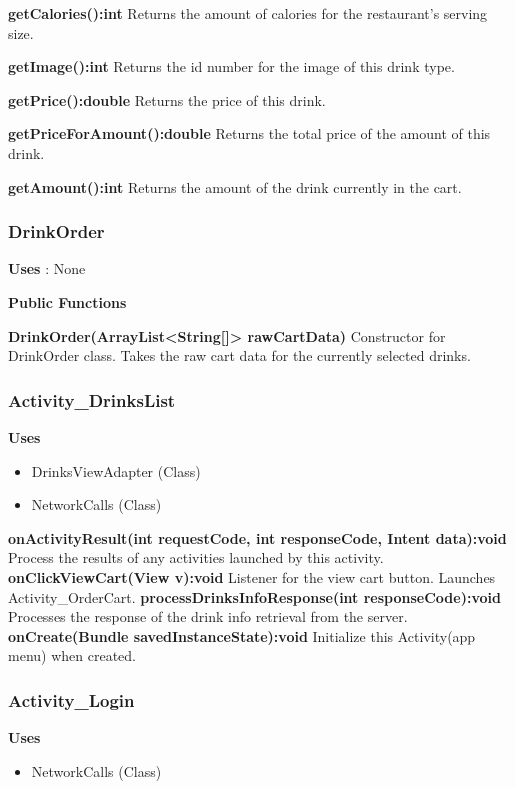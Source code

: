 \documentclass [10pt]{article}
\begin{document}
\textbf{getCalories():int}
Returns the amount of calories for the restaurant’s serving size.

\textbf{getImage():int}
Returns the id number for the image of this drink type.

\textbf{getPrice():double}
Returns the price of this drink.

\textbf{getPriceForAmount():double}
Returns the total price of the amount of this drink.

\textbf{getAmount():int}
Returns the amount of the drink currently in the cart.

\subsubsection{DrinkOrder}

\textbf{Uses} : None

\textbf{Public Functions}

\textbf{DrinkOrder(ArrayList<String[]> rawCartData)}
Constructor for DrinkOrder class. Takes the raw cart data for the currently selected drinks.

\subsubsection{Activity\_DrinksList}

\textbf{Uses}

\begin{itemize}
	\item DrinksViewAdapter (Class)
	\item NetworkCalls (Class)
\end{itemize}

\textbf{onActivityResult(int requestCode, int responseCode, Intent data):void}
Process the results of any activities launched by this activity.
\textbf{onClickViewCart(View v):void}
Listener for the view cart button. Launches Activity\_OrderCart.
\textbf{processDrinksInfoResponse(int responseCode):void}
Processes the response of the drink info retrieval from the server.
\textbf{onCreate(Bundle savedInstanceState):void}
Initialize this Activity(app menu) when created.

\subsubsection{Activity\_Login}

\textbf{Uses}
\begin{itemize}
	\item NetworkCalls (Class)
\end{itemize}
\end{document}
